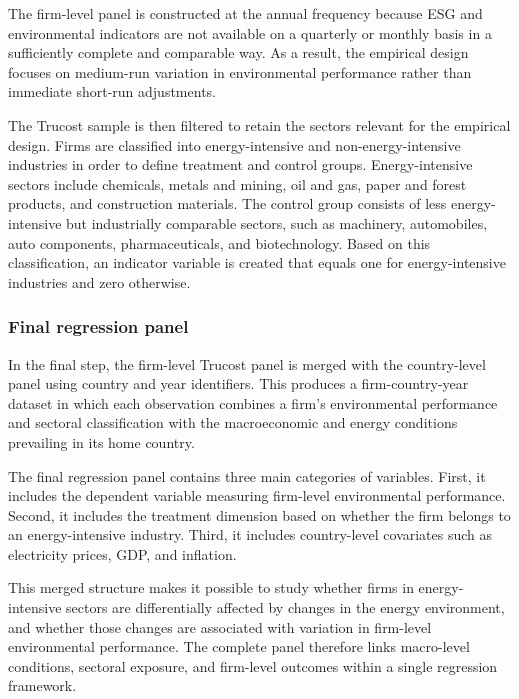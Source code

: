 
\noindent
The firm-level panel is constructed at the annual frequency because ESG and environmental indicators are not available on a quarterly or monthly basis in a sufficiently complete and comparable way. As a result, the empirical design focuses on medium-run variation in environmental performance rather than immediate short-run adjustments.

\noindent
The Trucost sample is then filtered to retain the sectors relevant for the empirical design. Firms are classified into energy-intensive and non-energy-intensive industries in order to define treatment and control groups. Energy-intensive sectors include chemicals, metals and mining, oil and gas, paper and forest products, and construction materials. The control group consists of less energy-intensive but industrially comparable sectors, such as machinery, automobiles, auto components, pharmaceuticals, and biotechnology. Based on this classification, an indicator variable is created that equals one for energy-intensive industries and zero otherwise.

\subsubsection{Final regression panel}

\noindent
In the final step, the firm-level Trucost panel is merged with the country-level panel using country and year identifiers. This produces a firm-country-year dataset in which each observation combines a firm's environmental performance and sectoral classification with the macroeconomic and energy conditions prevailing in its home country.

\noindent
The final regression panel contains three main categories of variables. First, it includes the dependent variable measuring firm-level environmental performance. Second, it includes the treatment dimension based on whether the firm belongs to an energy-intensive industry. Third, it includes country-level covariates such as electricity prices, GDP, and inflation.

\noindent
This merged structure makes it possible to study whether firms in energy-intensive sectors are differentially affected by changes in the energy environment, and whether those changes are associated with variation in firm-level environmental performance. The complete panel therefore links macro-level conditions, sectoral exposure, and firm-level outcomes within a single regression framework.